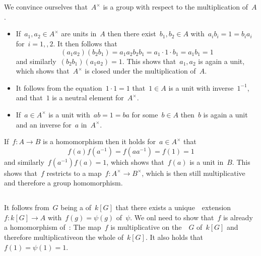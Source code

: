\section{}

We convince ourselves that~$A^\times$ is a group with respect to the multiplication of~$A$. 

\begin{itemize}
  \item
    If~$a_1, a_2 \in A^\times$ are units in~$A$ then there exist~$b_1, b_2 \in A$ with~$a_i b_i = 1 = b_i a_i$ for~$i = 1,, 2$.
    It then follows that
    \[
        (a_1 a_2) (b_2 b_1)
      = a_1 a_2 b_2 b_1
      = a_1 \cdot 1 \cdot b_1
      = a_1 b_1
      = 1
    \]
    and similarly~$(b_2 b_1) (a_1 a_2) = 1$.
    This shows that~$a_1, a_2$ is again a unit, which shows that~$A^\times$ is closed under the multiplication of~$A$.
  \item
    It follows from the equation~$1 \cdot 1 = 1$ that~$1 \in A$ is a unit with inverse~$1^{-1}$, and that~$1$ is a neutral element for~$A^\times$.
  \item
    If~$a \in A^\times$ is a unit with~$ab = 1 = ba$ for some~$b \in A$ then~$b$ is again a unit and an inverse for~$a$ in~$A^\times$.
\end{itemize}

If~$f \colon A \to B$ is a {\kalg} homomorphism then it holds for~$a \in A^\times$ that
\[
    f(a) f(a^{-1})
  = f(a a^{-1})
  = f(1)
  = 1
\]
and similarly~$f(a^{-1}) f(a) = 1$, which shows that~$f(a)$ is a unit in~$B$.
This shows that~$f$ restricts to a map~$f \colon A^\times \to B^\times$, which is then still multiplicative and therefore a group homomorphism.





\subsection{}

It follows from~$G$ being a {\kbasis} of~$k[G]$ that there exists a unique~{\klin}~extension~$f \colon k[G] \to A$ with~$f(g) = \psi(g)$ of~$\psi$.
We onl need to show that~$f$ is already a homomorphism of~{\kalg}:
The map~$f$ is multiplicative on the~{\kbasis}~$G$ of~$k[G]$ and therefore multiplicativeon the whole of~$k[G]$.
It also holds that~$f(1) = \psi(1) = 1$.





\subsection{}

